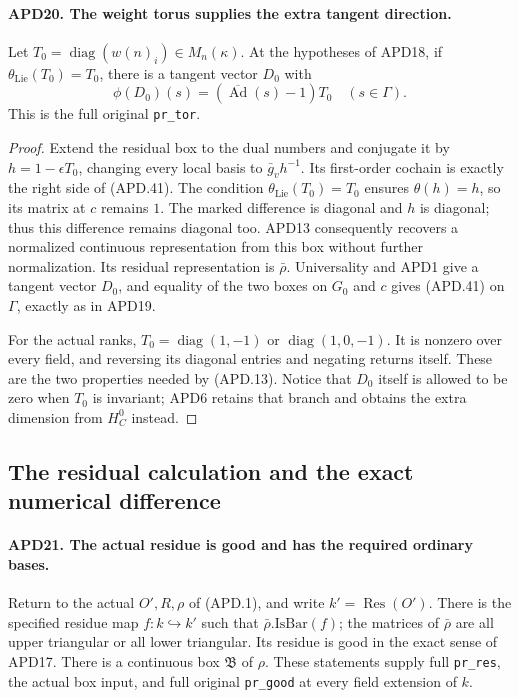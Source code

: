 \paragraph{APD20. The weight torus supplies the extra tangent direction.}
\label{claim:APD20}
Let
\(T_0=\operatorname{diag}(w(n)_i)\in M_n(\kappa)\).
At the hypotheses of APD18, if
\(\theta_{\mathrm{Lie}}(T_0)=T_0\), there is a tangent
vector \(D_0\) with
\[
       \phi(D_0)(s)=(\overline{\operatorname{Ad}}(s)-1)T_0
                         \quad(s\in\Gamma).             \tag{APD.41}
\]
This is the full original \texttt{pr\_tor}.

\begin{proof}
Extend the residual box to the dual numbers and conjugate it by
\(h=1-\epsilon T_0\), changing every local basis to
\(\bar g_vh^{-1}\).  Its first-order cochain is exactly the
right side of (APD.41).  The condition
\(\theta_{\mathrm{Lie}}(T_0)=T_0\) ensures
\(\theta(h)=h\), so its matrix at \(c\) remains \(1\).
The marked difference is diagonal and \(h\) is diagonal;
thus this difference remains diagonal too.  APD13 consequently
recovers a normalized continuous representation from this box
without further normalization.  Its residual representation is
\(\bar\rho\).  Universality and APD1 give a tangent vector
\(D_0\), and equality of the two boxes on \(G_0\) and \(c\)
gives (APD.41) on \(\Gamma\), exactly as in APD19.

For the actual ranks, \(T_0=\operatorname{diag}(1,-1)\) or
\(\operatorname{diag}(1,0,-1)\).  It is nonzero over every
field, and reversing its diagonal entries and negating returns
itself.  These are the two properties needed by (APD.13).
Notice that \(D_0\) itself is allowed to be zero when
\(T_0\) is invariant; APD6 retains that branch and obtains
the extra dimension from \(H_C^0\) instead.
\end{proof}

\subsection{The residual calculation and the exact numerical difference}

\paragraph{APD21. The actual residue is good and has the required ordinary bases.}
\label{claim:APD21}
Return to the actual \(O',R,\rho\) of (APD.1), and write
\(k'=\operatorname{Res}(O')\).  There is the specified residue
map \(f:k\hookrightarrow k'\) such that
\(\bar\rho.\mathrm{IsBar}(f)\); the matrices of \(\bar\rho\)
are all upper triangular or all lower triangular.  Its residue is
good in the exact sense of APD17.  There is a continuous box
\(\mathfrak B\) of \(\rho\).  These statements supply full
\texttt{pr\_res}, the actual box input, and full original
\texttt{pr\_good} at every field extension of \(k\).

